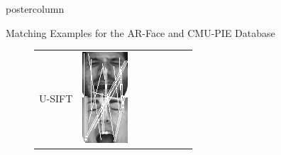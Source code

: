 \documentclass[final,hyperref={pdfpagelabels=false}]{beamer}
\begin{document}
\begin{frame}
\begin{columns}
\begin{column}{.49\textwidth}
\begin{beamercolorbox}[center,wd=\textwidth]{postercolumn}
\begin{minipage}[T]{.95\textwidth}
{\begin{block}{Matching Examples for the AR-Face and CMU-PIE Database}
\begin{figure}
\begin{tabular}{p{.09\linewidth} | p{.12\linewidth} | p{.12\linewidth} | p{.12\linewidth} || p{.12\linewidth} | p{.12\linewidth} | p{.12\linewidth} | p{.09\linewidth} }
                  U-SIFT
                  &
                  \includegraphics[width=1.0\linewidth]{paper/bmvc09-surf/figures/matchings/arface-usift/maximum_m-005-17.pgm--w-052-4}
                  &

\end{tabular}
\end{figure}
\end{block}}
\end{minipage}
\end{beamercolorbox}
\end{column}
\end{columns}
\end{frame}
\end{document}
